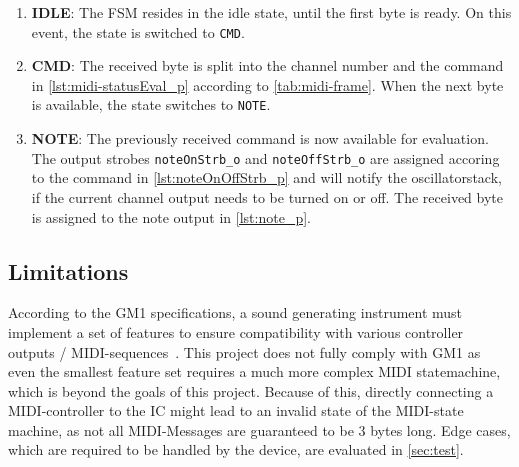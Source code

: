 \begin{enumerate}[noitemsep]
	\item \textbf{IDLE}: The \acs{FSM} resides in the idle state, until the first byte is ready. On this event, the state is switched to \lstinline!CMD!.
	\item \textbf{CMD}: The received byte is split into the channel number and the command in \autoref{lst:midi-statusEval_p} according to \autoref{tab:midi-frame}. When the next byte is available, the state switches to \lstinline!NOTE!.
	\item \textbf{NOTE}: The previously received command is now available for evaluation. The output strobes \lstinline!noteOnStrb_o! and \lstinline!noteOffStrb_o! are assigned accoring to the command in \autoref{lst:noteOnOffStrb_p} and will notify the oscillatorstack, if the current channel output needs to be turned on or off. The received byte is assigned to the note output in \autoref{lst:note_p}.
\end{enumerate}







\subsection{Limitations}

According to the \ac{GM1} specifications, a sound generating instrument must implement a set of features to ensure compatibility with various controller outputs / \acs{MIDI}-sequences~\cite{gm1_specification_online}. This project does not fully comply with \acs{GM1} as even the smallest feature set requires a much more complex \acs{MIDI} statemachine, which is beyond the goals of this project. Because of this, directly connecting a \acs{MIDI}-controller to the \acs{IC} might lead to an invalid state of the \acs{MIDI}-state machine, as not all \acs{MIDI}-Messages are guaranteed to be 3 bytes long. Edge cases, which are required to be handled by the device, are evaluated in \autoref{sec:test}.


